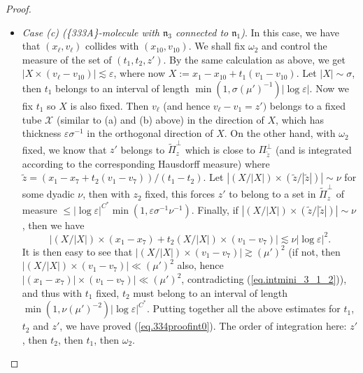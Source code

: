 \documentclass[10pt, reqno]{amsart}
\newcommand{\Xc}{\mathcal X}
\newcommand{\nf}{\mathfrak n}
\theoremstyle{definition}
\theoremstyle{remark}
\numberwithin{equation}{section}
\begin{document}
\begin{proof}
\begin{itemize}
Now we can repeat the discussion in (a) with $(x_\ell,v_\ell)$ in place of $(x_{10},v_{10})$. Note that now $|z+v_1-v_7|=|v_j-v_7|\sim\nu$ in comparison with (a); moreover, the $X$ in (a) should be replaced by $\widetilde{X}=x_7=t_2v_7-x_\ell-t_2v_\ell$ which equals $(t_1-t_2)\widetilde{z}'+X'+O(\varepsilon\mu^{-1})$ where $X'$ depends only on $t_1$ and $t_2$, so if $|X'|\sim\sigma$ as in (a) then $\widetilde{z}'$ belongs to a set of measure $\lesssim\min(1,\sigma\mu^{-1})$ with $t_1$ and $t_2$ fixed. Finally, with $(t_1,t_2,\widetilde{z}')$ fixed, the same proof in (a) yields that $\omega_2$ belongs to a set of measure $\lesssim \min(1,\varepsilon^{1/2}\sigma^{-1/2}\nu^{-1/2})|\log\varepsilon|$. Putting together the above estimates for $t_1$ and $\widetilde{z}'$ and $\omega_2$, we have proved (\ref{eq.334proofint0}). The order of integration here: $\omega_2$, then $\widetilde{z}'$ (mapped from $z'$), then $t_1$, then $t_2$.
\item \emph{Case (c) (\{333A\}-molecule with $\nf_3$ connected to $\nf_1$)}. In this case, we have that $(x_\ell,v_\ell)$ collides with $(x_{10},v_{10})$. We shall fix $\omega_2$ and control the measure of the set of $(t_1,t_2,z')$. By the same calculation as above, we get $|X\times(v_\ell-v_{10})|\lesssim\varepsilon$, where now $X:=x_1-x_{10}+t_1(v_1-v_{10})$. Let $|X|\sim\sigma$, then $t_1$ belongs to an interval of length $\min(1,\sigma(\mu')^{-1})|\log\varepsilon|$. Now we fix $t_1$ so $X$ is also fixed. Then $v_\ell$ (and hence $v_\ell-v_1=z')$ belongs to a fixed tube $\Xc$ (similar to (a) and (b) above) in the direction of $X$, which has thickness $\varepsilon\sigma^{-1}$ in the orthogonal direction of $X$. On the other hand, with $\omega_2$ fixed, we know that $z'$ belongs to $\widetilde{\Pi}_z^\perp$ which is close to $\Pi_{\widetilde{z}}^\perp$ (and is integrated according to the corresponding Hausdorff measure) where $\widetilde{z}=(x_1-x_7+t_2(v_1-v_7))/(t_1-t_2)$. Let $|(X/|X|)\times (\widetilde{z}/|\widetilde{z}|)|\sim\nu$ for some dyadic $\nu$, then with $z_2$ fixed, this forces $z'$ to belong to a set in $\widetilde{\Pi}_z^\perp$ of measure $\leq |\log\varepsilon|^{C^*}\min(1,\varepsilon\sigma^{-1}\nu^{-1})$. Finally, if $|(X/|X|)\times (\widetilde{z}/|\widetilde{z}|)|\sim\nu$, then we have
\[\big|(X/|X|)\times (x_1-x_7)+t_2(X/|X|)\times (v_1-v_7)\big|\lesssim\nu|\log\varepsilon|^2.\] It is then easy to see that $|(X/|X|)\times (v_1-v_7)|\gtrsim(\mu')^2$ (if not, then $|(X/|X|)\times (v_1-v_7)|\ll(\mu')^2$ also, hence $|(x_1-x_7)|\times(v_1-v_7)|\ll(\mu')^2$, contradicting (\ref{eq.intmini_3_1_2})), and thus with $t_1$ fixed, $t_2$ must belong to an interval of length $\min(1,\nu(\mu')^{-2})|\log\varepsilon|^{C^*}$. Putting together all the above estimates for $t_1$, $t_2$ and $z'$, we have proved (\ref{eq.334proofint0}). The order of integration here: $z'$, then $t_2$, then $t_1$, then $\omega_2$.\qedhere
\end{itemize}
\end{proof}
\end{document}

